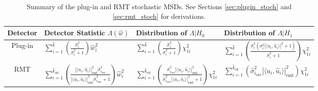 \begin{table*}[ht!]
\centering
\begin{tabular}{clll}\toprule
 Detector & Detector Statistic $\Lambda(\widehat{w})$  & Distribution  of $\Lambda|H_0$ & Distribution of $\Lambda|H_1$\\
\midrule
Plug-in & $\sum_{i=1}^{\widehat{k}}\left(\frac{\widehat{\sigma}_i^2}{\widehat{\sigma}_i^2+1}\right)\widehat{w}_i^2$ & $\sum_{i=1}^{\widehat{k}}\left(\frac{\widehat{\sigma}_i^2}{\widehat{\sigma}_i^2+1}\right)\chi^2_{1i}$ & $\sum_{i=1}^{\widehat{k}}\left(\frac{\widehat{\sigma}_i^2\left(\sigma^2_i|\langle u_i,\widehat{u}_i\rangle|^2+1\right)}{\widehat{\sigma}_i^2+1}\right)\chi^2_{1i}$\\
 RMT & $\sum_{i=1}^{\widehat{k}_{\text{eff}}}\left(\frac{|\langle u_i,\widehat{u}_i\rangle|^2_{\text{rmt}}\widehat{\sigma}_{i_\text{rmt}}^2}{|\langle u_i,\widehat{u}_i\rangle|^2_{\text{rmt}}\widehat{\sigma}_{i_\text{rmt}}^2+1 }\right)\widehat{w}_i^2$ & $\sum_{i=1}^{\widehat{k}_{\text{eff}}}\left(\frac{\widehat{\sigma}_{i_\text{rmt}}^2|\langle u_i,\widehat{u}_i\rangle|^2_{\text{rmt}}}{\widehat{\sigma}_{i_\text{rmt}}^2|\langle u_i,\widehat{u}_i\rangle|^2_{\text{rmt}}+1}\right)\chi^2_{1i}$ & $\sum_{i=1}^{\widehat{k}_{\text{eff}}}\left(\widehat{\sigma}^2_{i_\text{rmt}}|\langle u_i,\widehat{u}_i\rangle|^2_{\text{rmt}}\right)\chi^2_{1i}$\\
\bottomrule
\end{tabular}
\caption{Summary of the plug-in and RMT stochastic MSDs. See Sections \ref{sec:plugin_stoch} and \ref{sec:rmt_stoch} for derivations.}\vskip-0.2cm
\label{table:summary_stoch}
\vspace{-0.1in}
\end{table*}




